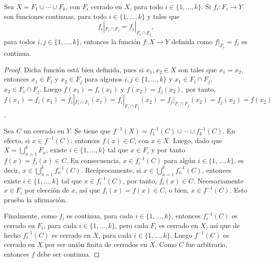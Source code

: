 

\begin{theorem}
Sea $X = F_1 \cup \cdots \cup F_k$, con $F_i$ cerrado en $X$, para todo $i \in \{ 1,\ldots,k \}$. Si $f_i : F_i \longrightarrow Y$ son funciones continuas, para todo $i \in \{ 1,\ldots,k \}$ y tales que
\begin{equation*}
    f_i|_{F_i \cap F_j} = f_j|_{F_i \cap F_j},
\end{equation*}
para todos $i,j \in \{ 1,\ldots,k \}$, entonces la función $f : X \longrightarrow Y$ definida como $f|_{F_i} = f_i$ es continua.
\end{theorem}

\begin{proof}
Dicha función está bien definida, pues si $x_1, x_2 \in X$ son tales que $x_1 = x_2$, entonces $x_1 \in F_i$ y $x_2 \in F_j$ para algunos $i,j \in \{ 1,\ldots,k \}$ y $x_1 \in F_i \cap F_j$, $x_2 \in F_i \cap F_j$. Luego $f(x_1) = f_i(x_1)$ y $f(x_2) = f_j(x_2)$, por tanto, $f(x_1) = f_i(x_1) = f_i|_{F_i \cap F_j}(x_1) = f_i|_{F_i \cap F_j}(x_2) = f_j|_{F_i \cap F_j} (x_2) = f_j(x_2) = f(x_2)$.
\bigskip

Sea $C$ un cerrado en $Y$. Se tiene que $f^{-1}(X) = f_1^{-1}(C) \cup \cdots \cup f_k^{-1}(C)$. En efecto, si $x \in f^{-1}(C)$, entonces $f(x) \in C$, con $x \in X$. Luego, dado que $X = \bigcup_{n=1}^{k} F_n$, existe $i \in \{ 1,\ldots,k \}$ tal que $x \in F_i$ y por tanto $f(x) = f_i(x) \in C$. En consecuencia, $x \in f^{-1}_i (C)$ para algún $i \in \{ 1,\ldots,k \}$, es decir, $x \in \bigcup_{n=1}^{k} f^{-1}_n(C)$. Recíprocamente, si $x \in \bigcup_{n=1}^{k} f^{-1}_n(C)$, entonces existe $i \in \{ 1,\ldots,k \}$ tal que $x \in f^{-1}_i(C)$, por tanto, $f_i(x) \in C$. Necesariamente $x \in F_i$ por elección de $x$, así que $f_i(x) = f(x) \in C$, o bien, $x \in f^{-1}(C)$. Esto prueba la afirmación.
\bigskip

Finalmente, como $f_i$ es continua, para cada $i \in \{ 1,\ldots,k \}$, entonces $f^{-1}_i(C)$ es cerrado en $F_i$, para cada $i \in \{ 1,\ldots,k \}$, pero cada $F_i$ es cerrado en $X$, así que de hecho $f^{-1}_i(C)$ es cerrado en $X$, para cada $i \in \{ 1,\ldots,k \}$. Luego $f^{-1}(C)$ es cerrado en $X$ por ser unión finita de cerrados en $X$. Como $C$ fue arbitrario, entonces $f$ debe ser continua.
\end{proof}
